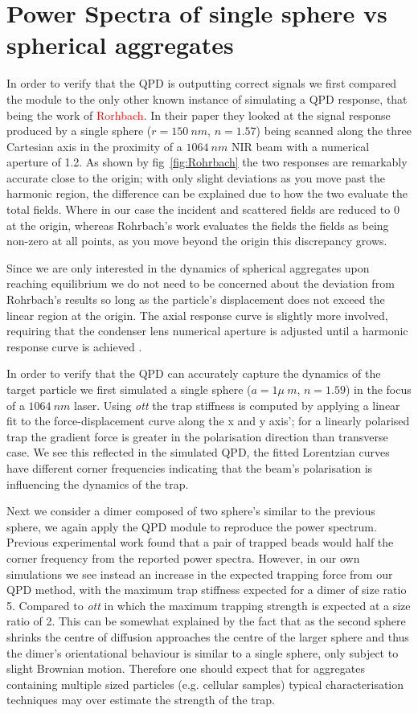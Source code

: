 \section{Power Spectra of single sphere vs spherical aggregates}
In order to verify that the QPD is outputting correct signals we first compared the module to the only other known instance of simulating a QPD response, that being the work of \textcolor{red}{Rorhbach}. In their paper they looked at the signal response produced by a single sphere ($r = 150\ nm$, $n = 1.57$) being scanned along the three Cartesian axis in the proximity 
of a $1064\ nm$ NIR beam with a numerical aperture of 1.2. As shown by fig~\ref{fig:Rohrbach} the two responses are remarkably accurate close to the origin; with only slight deviations as you move past the harmonic region, the difference can be explained due to how the two evaluate the total fields. Where in our case the incident and scattered fields are reduced to 0 at the origin, whereas Rohrbach's work evaluates the fields the fields as being non-zero at all points, as you move beyond the origin this discrepancy grows. 

Since we are only interested in the dynamics of spherical aggregates upon reaching equilibrium we do not need to be concerned about the deviation from Rohrbach's results so long as the particle's displacement does not exceed the linear region at the origin. The axial response curve is slightly more involved, requiring that the condenser lens numerical aperture is adjusted until a harmonic response curve is achieved \cite{Friedrich2012}. 

In order to verify that the QPD can accurately capture the dynamics of the target particle we first simulated a single sphere ($a = 1\mu\ m$, $n=1.59$) in the focus of a $1064\ nm$ laser. Using \textit{ott} the trap stiffness is computed by applying a linear fit to the force-displacement curve along the x and y axis'; for a linearly polarised trap the gradient force is greater in the polarisation direction than transverse case. We see this reflected in the simulated QPD, the fitted Lorentzian curves have different corner frequencies indicating that the beam's polarisation is influencing the dynamics of the trap. 

Next we consider a dimer composed of two sphere's similar to the previous sphere, we again apply the QPD module to reproduce the power spectrum. Previous experimental work found that a pair of trapped beads would half the corner frequency from the reported power spectra. However, in our own simulations we see instead an increase in the expected trapping force from our QPD method, with the maximum trap stiffness expected for a dimer of size ratio 5. Compared to \textit{ott} in which the maximum trapping strength is expected at a size ratio of 2. This can be somewhat explained by the fact that as the second sphere shrinks the centre of diffusion approaches the centre of the larger sphere and thus the dimer's orientational behaviour is similar to a single sphere, only subject to slight Brownian motion. Therefore one should expect that for aggregates containing multiple sized particles (e.g. cellular samples) typical characterisation techniques may over estimate the strength of the trap.


